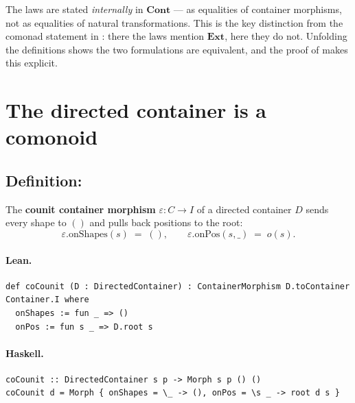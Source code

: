 \documentclass[11pt,a4paper]{article}
\begin{document}
\begin{fidelitynote}
The laws are stated \emph{internally} in $\mathbf{Cont}$ --- as equalities of
container morphisms, not as equalities of natural transformations.  This is the
key distinction from the comonad statement in : there
the laws mention $\mathbf{Ext}$, here they do not.  Unfolding the definitions
shows the two formulations are equivalent, and the proof of 
makes this explicit.
\end{fidelitynote}


\section{The directed container is a comonoid}

\subsection{Definition: }

\begin{defn}
The \textbf{counit container morphism} $\varepsilon : C \to I$ of a directed
container $D$ sends every shape to $()$ and pulls back positions to the root:
\[
  \varepsilon.\mathrm{onShapes}(s) \;=\; (), \qquad
  \varepsilon.\mathrm{onPos}(s, \_) \;=\; o(s).
\]
\end{defn}

\paragraph{Lean.}
\begin{lstlisting}[style=lean]
def coCounit (D : DirectedContainer) : ContainerMorphism D.toContainer Container.I where
  onShapes := fun _ => ()
  onPos := fun s _ => D.root s
\end{lstlisting}

\paragraph{Haskell.}
\begin{lstlisting}[style=haskell]
coCounit :: DirectedContainer s p -> Morph s p () ()
coCounit d = Morph { onShapes = \_ -> (), onPos = \s _ -> root d s }
\end{lstlisting}
\end{document}
